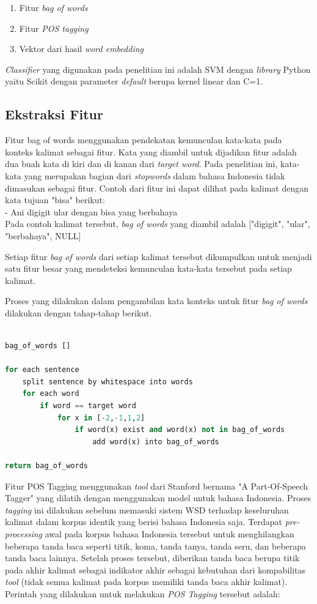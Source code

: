 \begin{enumerate}
	\item Fitur \textit{bag of words}
	\item Fitur \textit{POS tagging}
	\item Vektor dari hasil \textit{word embedding}
\end{enumerate}

\textit{Classifier} yang digunakan pada penelitian ini adalah SVM dengan \textit{library} Python yaitu Scikit dengan parameter \textit{default} berupa kernel linear dan C=1.

\subsection{Ekstraksi Fitur}
Fitur bag of words menggunakan pendekatan kemunculan kata-kata pada konteks kalimat sebagai fitur. Kata yang diambil untuk dijadikan fitur adalah dua buah kata di kiri dan di kanan dari \textit{target word}. Pada penelitian ini, kata-kata yang merupakan bagian dari \textit{stopwords} dalam bahasa Indonesia tidak dimasukan sebagai fitur. Contoh dari fitur ini dapat dilihat pada kalimat dengan kata tujuan "bisa" berikut:
\\
- Ani digigit ular dengan bisa yang berbahaya
\\
Pada contoh kalimat tersebut, \textit{bag of words} yang diambil adalah ["digigit", "ular", "berbahaya", NULL]

Setiap fitur \textit{bag of words} dari setiap kalimat tersebut dikumpulkan untuk menjadi satu fitur besar yang mendeteksi kemunculan kata-kata tersebut pada setiap kalimat.

Proses yang dilakukan dalam pengambilan kata konteks untuk fitur \textit{bag of words} dilakukan dengan tahap-tahap berikut.

\begin{lstlisting}[language=python,caption={Fitur Bag of Words}, label={fitur-bag-of-words}]

bag_of_words []

for each sentence
	split sentence by whitespace into words
	for each word
		if word == target word
			for x in [-2,-1,1,2]
				if word(x) exist and word(x) not in bag_of_words
					add word(x) into bag_of_words
					
return bag_of_words

\end{lstlisting}

Fitur POS Tagging menggunakan \textit{tool} dari Stanford bernama "A Part-Of-Speech Tagger" yang dilatih dengan menggunakan model untuk bahasa Indonesia. Proses \textit{tagging} ini dilakukan sebelum memasuki sistem WSD terhadap keseluruhan kalimat dalam korpus identik yang berisi bahasa Indonesia saja. Terdapat \textit{pre-processing} awal pada korpus bahasa Indonesia tersebut untuk menghilangkan beberapa tanda baca seperti titik, koma, tanda tanya, tanda seru, dan beberapa tanda baca lainnya. Setelah proses tersebut, diberikan tanda baca berupa titik pada akhir kalimat sebagai indikator akhir sebagai kebutuhan dari kompabilitas \textit{tool} (tidak semua kalimat pada korpus memiliki tanda baca akhir kalimat). Perintah yang dilakukan untuk melakukan \textit{POS Tagging} tersebut adalah:

